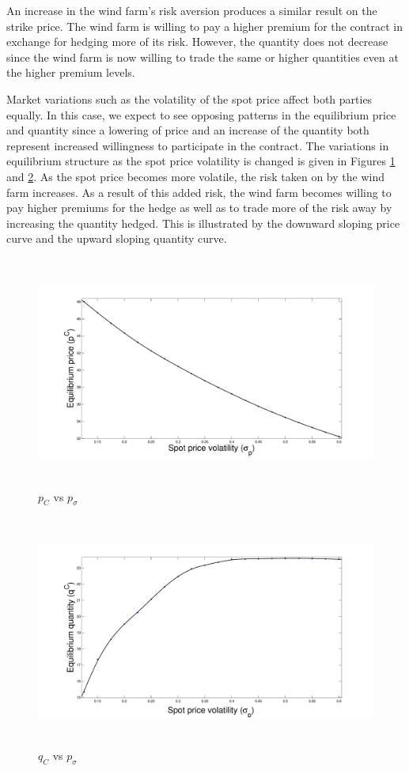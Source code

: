 An increase in the wind farm's risk aversion produces a similar result on the
strike price. The wind farm is willing to pay a higher premium for the contract
in exchange for hedging more of its risk. However, the quantity does not
decrease since the wind farm is now willing to trade the same or higher
quantities even at the higher premium levels.

Market variations such as the volatility of the spot price affect both parties
equally. In this case, we expect to see opposing patterns in the equilibrium
price and quantity since a lowering of price and an increase of the quantity
both represent increased willingness to participate in the contract.
The variations in equilibrium structure as the spot price volatility is changed
is given in Figures \ref{pcpvol} and \ref{qcpvol}. As the spot price becomes
more volatile, the risk taken on by the wind farm increases. As a result of this
added risk, the wind farm becomes willing to pay higher premiums for the hedge
as well as to trade more of the risk away by increasing the quantity hedged.
This is illustrated by the downward sloping price curve and the upward sloping
quantity curve.

\begin{figure}[t]
	\begin{center}
		\includegraphics[height=3in]{figures/price_vol.pdf}
		\caption{$p_C$ vs $p_\sigma$} \label{pcpvol}
	\end{center}
\end{figure}
\begin{figure}[t]
	\begin{center}
		\includegraphics[height=3in]{figures/q_price_vol.pdf}
		\caption{$q_C$ vs $p_\sigma$} \label{qcpvol}
	\end{center}
\end{figure}


